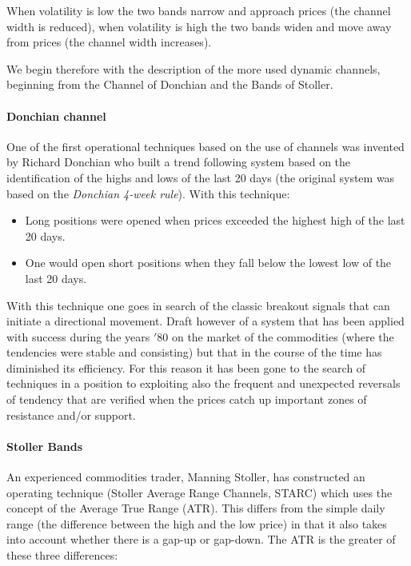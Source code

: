 When volatility is low the two bands narrow and approach prices (the channel width is reduced), when volatility is high the two bands widen and move away from prices (the channel width increases). 

We begin therefore with the description of the more used dynamic channels, beginning from the Channel of Donchian and the Bands of Stoller. 

\paragraph{\textbf{Donchian channel}}\mbox{}

One of the first operational techniques based on the use of channels was invented by Richard Donchian who built a trend following system based on the identification of the highs and lows of the last 20 days (the original system was based on the \textit{Donchian 4-week rule}). With this technique:

\begin{itemize}
\setlength\itemsep{0.3em}
\item Long positions were opened when prices exceeded the highest high of the last 20 days.
\item One would open short positions when they fall below the lowest low of the last 20 days.
\end{itemize}  

With this technique one goes in search of the classic breakout signals that can initiate a directional movement. Draft however of a system that has been applied with success during the years $'80$ on the market of the commodities (where the tendencies were stable and consisting) but that in the course of the time has diminished its efficiency. For this reason it has been gone to the search of techniques in a position to exploiting also the frequent and unexpected reversals of tendency that are verified when the prices catch up important zones of resistance and/or support.

\paragraph{\textbf{Stoller Bands}}\mbox{}

An experienced commodities trader, Manning Stoller, has constructed an operating technique (Stoller Average Range Channels, STARC) which uses the concept of the Average True Range (ATR). This differs from the simple daily range (the difference between the high and the low price) in that it also takes into account whether there is a gap-up or gap-down.
The ATR is the greater of these three differences:

